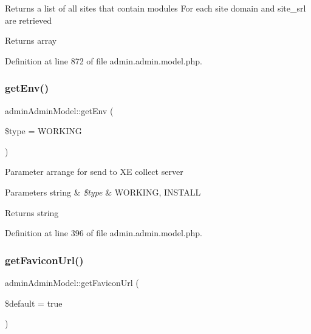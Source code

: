Returns a list of all sites that contain modules For each site domain and site\+\_\+srl are retrieved

\begin{DoxyReturn}{Returns}
array 
\end{DoxyReturn}


Definition at line 872 of file admin.\+admin.\+model.\+php.

\mbox{\label{classadminAdminModel_aae89799bb4f84379b6adb15a01dd6c8b}} 
\subsubsection{\texorpdfstring{get\+Env()}{getEnv()}}
{\footnotesize\ttfamily admin\+Admin\+Model\+::get\+Env (\begin{DoxyParamCaption}\item[{}]{\$type = {\ttfamily \textquotesingle{}WORKING\textquotesingle{}} }\end{DoxyParamCaption})}

Parameter arrange for send to XE collect server 
\begin{DoxyParams}[1]{Parameters}
string & {\em \$type} & \textquotesingle{}W\+O\+R\+K\+I\+NG\textquotesingle{}, \textquotesingle{}I\+N\+S\+T\+A\+LL\textquotesingle{} \\
\hline
\end{DoxyParams}
\begin{DoxyReturn}{Returns}
string 
\end{DoxyReturn}


Definition at line 396 of file admin.\+admin.\+model.\+php.

\mbox{\label{classadminAdminModel_a94cadc80816d875f0713507d356c422b}} 
\subsubsection{\texorpdfstring{get\+Favicon\+Url()}{getFaviconUrl()}}
{\footnotesize\ttfamily admin\+Admin\+Model\+::get\+Favicon\+Url (\begin{DoxyParamCaption}\item[{}]{\$default = {\ttfamily true} }\end{DoxyParamCaption})}



